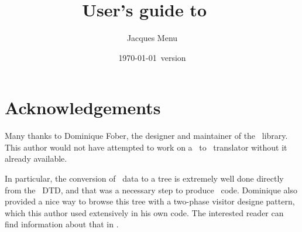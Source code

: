 \documentclass[12pt,a4paper]{article}
\begin{document}


\title{
User's guide to \xmlToLy\ \\[5pt]
}

\author{
Jacques Menu
}

\date {\normalsize \today\ version}

\maketitle
\thispagestyle{fancy} %


\section{Acknowledgements}

Many thanks to Dominique Fober, the designer and maintainer of the \lib\ library. This author would not have attempted to work on a \mxml\ to \lily\ translator without it already available.

In particular, the conversion of \mxml\ data to a tree is extremely well done directly from the \mxml\ DTD, and that was a necessary step to produce \lily\ code. Dominique also provided a nice way to browse this tree with a two-phase visitor designe pattern, which this author used extensively in his own code. The interested reader can find information about that in .
\end{document}
